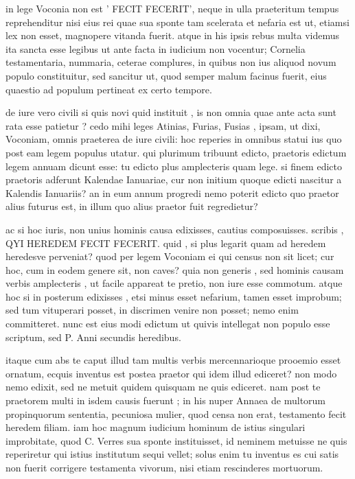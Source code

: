  in lege Voconia non est ' FECIT FECERIT', neque in ulla praeteritum tempus reprehenditur nisi eius rei quae sua sponte tam scelerata et nefaria est ut, etiamsi lex non esset, magnopere vitanda fuerit. atque in his ipsis rebus multa videmus ita sancta esse legibus ut ante facta in iudicium non vocentur; Cornelia testamentaria, nummaria, ceterae complures, in quibus non ius aliquod novum populo constituitur, sed sancitur ut, quod semper malum facinus fuerit, eius quaestio ad populum pertineat ex certo tempore.

 de iure vero civili si quis novi quid instituit , is non omnia quae ante acta sunt rata esse patietur ? cedo mihi leges Atinias, Furias, Fusias , ipsam, ut dixi, Voconiam, omnis praeterea de iure civili: hoc reperies in omnibus statui ius quo post eam legem populus utatur. qui plurimum tribuunt edicto, praetoris edictum legem annuam dicunt esse: tu edicto plus amplecteris quam lege. si finem edicto praetoris adferunt Kalendae Ianuariae, cur non initium quoque edicti nascitur a Kalendis Ianuariis? an in eum annum progredi nemo poterit edicto quo praetor alius futurus est, in illum quo alius praetor fuit regredietur?

 ac si hoc iuris, non unius hominis causa edixisses, cautius composuisses. scribis , QYI HEREDEM FECIT FECERIT. quid , si plus legarit quam ad heredem heredesve perveniat? quod per legem Voconiam ei qui census non sit licet; cur hoc, cum in eodem genere sit, non caves? quia non generis , sed hominis causam verbis amplecteris , ut facile appareat te pretio, non iure esse commotum. atque hoc si in posterum edixisses , etsi minus esset nefarium, tamen esset improbum; sed tum vituperari posset, in discrimen venire non posset; nemo enim committeret. nunc est eius modi edictum ut quivis intellegat non populo esse scriptum, sed P. Anni secundis heredibus.

 itaque cum abs te caput illud tam multis verbis mercennarioque prooemio esset ornatum, ecquis inventus est postea praetor qui idem illud ediceret? non modo nemo edixit, sed ne metuit quidem quisquam ne quis ediceret. nam post te praetorem multi in isdem causis fuerunt ; in his nuper Annaea de multorum propinquorum sententia, pecuniosa mulier, quod censa non erat, testamento fecit heredem filiam. iam hoc magnum iudicium hominum de istius singulari improbitate, quod C. Verres sua sponte instituisset, id neminem metuisse ne quis reperiretur qui istius institutum sequi vellet; solus enim tu inventus es cui satis non fuerit corrigere testamenta vivorum, nisi etiam rescinderes mortuorum.

